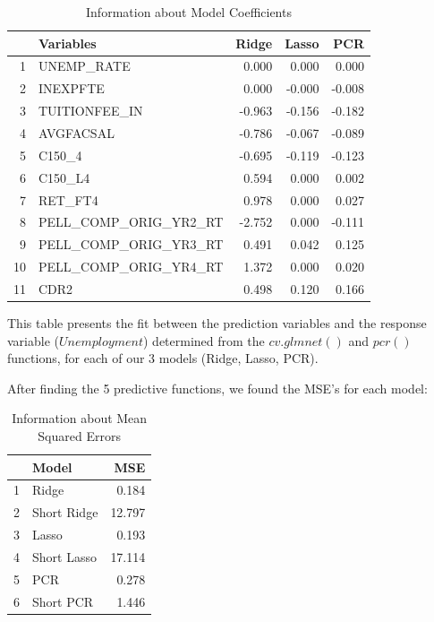 \documentclass{article}\usepackage[]{graphicx}\usepackage[]{color}
\begin{document}
\begin{center}
\begin{table}[ht]
\centering
\caption{Information about Model Coefficients} 
\begin{tabular}{rlrrr}
  \hline
 & Variables & Ridge & Lasso & PCR \\ 
  \hline
1 & UNEMP\_RATE & 0.000 & 0.000 & 0.000 \\ 
  2 & INEXPFTE & 0.000 & -0.000 & -0.008 \\ 
  3 & TUITIONFEE\_IN & -0.963 & -0.156 & -0.182 \\ 
  4 & AVGFACSAL & -0.786 & -0.067 & -0.089 \\ 
  5 & C150\_4 & -0.695 & -0.119 & -0.123 \\ 
  6 & C150\_L4 & 0.594 & 0.000 & 0.002 \\ 
  7 & RET\_FT4 & 0.978 & 0.000 & 0.027 \\ 
  8 & PELL\_COMP\_ORIG\_YR2\_RT & -2.752 & 0.000 & -0.111 \\ 
  9 & PELL\_COMP\_ORIG\_YR3\_RT & 0.491 & 0.042 & 0.125 \\ 
  10 & PELL\_COMP\_ORIG\_YR4\_RT & 1.372 & 0.000 & 0.020 \\ 
  11 & CDR2 & 0.498 & 0.120 & 0.166 \\ 
   \hline
\end{tabular}
\end{table}

\end{center}

This table presents the fit between the prediction variables and the response variable ($Unemployment$) determined from the $cv.glmnet()$ and $pcr()$ functions, for each of our 3 models (Ridge, Lasso, PCR).

After finding the 5 predictive functions, we found the MSE's for each model:

\begin{center}

\begin{table}[ht]
\centering
\caption{Information about Mean Squared Errors} 
\begin{tabular}{rlr}
  \hline
 & Model & MSE \\ 
  \hline
1 & Ridge & 0.184 \\ 
  2 & Short Ridge & 12.797 \\ 
  3 & Lasso & 0.193 \\ 
  4 & Short Lasso & 17.114 \\ 
  5 & PCR & 0.278 \\ 
  6 & Short PCR & 1.446 \\ 
   \hline
\end{tabular}
\end{table}


\end{center}
\end{document}
